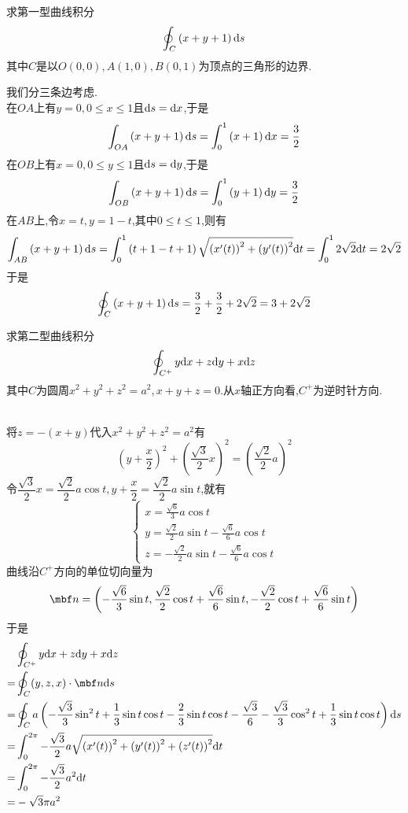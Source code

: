 \documentclass{ctexart}
\begin{document}
\begin{problem}[3.(12\songti{分})]
    求第一型曲线积分
    \[\oint_C\left(x+y+1\right)\mathrm{d} s\]
    其中$C$是以$O(0,0),A(1,0),B(0,1)$为顶点的三角形的边界.

\end{problem}
\begin{solution}
    我们分三条边考虑.\\
    在$OA$上有$y=0,0\leqslant x\leqslant 1$且$\mathrm{d} s=\mathrm{d} x$,于是
    \[\int_{OA}\left(x+y+1\right)\mathrm{d} s=\int_0^1\left(x+1\right)\mathrm{d} x=\dfrac32\]
    在$OB$上有$x=0,0\leqslant y\leqslant 1$且$\mathrm{d} s=\mathrm{d} y$,于是
    \[\int_{OB}\left(x+y+1\right)\mathrm{d} s=\int_0^1\left(y+1\right)\mathrm{d} y=\dfrac32\]
    在$AB$上,令$x=t,y=1-t$,其中$0\leqslant t\leqslant 1$,则有
    \[\int_{AB}\left(x+y+1\right)\mathrm{d} s=\int_0^1\left(t+1-t+1\right)\sqrt{\left(x'(t)\right)^2+\left(y'(t)\right)^2}\mathrm{d} t=\int_0^12\sqrt2\mathrm{d} t=2\sqrt2\]
    于是
    \[\oint_C\left(x+y+1\right)\mathrm{d} s=\dfrac32+\dfrac32+2\sqrt2=3+2\sqrt2\]

\end{solution}
\begin{problem}[4.(14\songti{分})]
    求第二型曲线积分
    \[\oint_{C^+}y\mathrm{d} x+z\mathrm{d} y+x\mathrm{d} z\]
    其中$C$为圆周$x^2+y^2+z^2=a^2,x+y+z=0$.从$x$轴正方向看,$C^+$为逆时针方向.
        
\end{problem}
\begin{solution}
    \\
    将$z=-(x+y)$代入$x^2+y^2+z^2=a^2$有
    \[\left(y+\dfrac x2\right)^2+\left(\dfrac{\sqrt3}{2}x\right)^2=\left(\dfrac{\sqrt2}{2}a\right)^2\]
    令$\dfrac{\sqrt3}{2}x=\dfrac{\sqrt2}{2}a\cos t,y+\dfrac x2=\dfrac{\sqrt2}{2}a\sin t$,就有
    \[\left\{\begin{array}{l}
        x=\frac{\sqrt6}{3}a\cos t \\
        y=\frac{\sqrt2}{2}a\sin t-\frac{\sqrt6}{6}a\cos t \\
        z=-\frac{\sqrt2}{2}a\sin t-\frac{\sqrt6}{6}a\cos t
    \end{array}\right.\]
    曲线沿$C^+$方向的单位切向量为
    \[\mbf n=\left(-\dfrac{\sqrt6}{3}\sin t,\dfrac{\sqrt2}{2}\cos t+\frac{\sqrt6}{6}\sin t,-\dfrac{\sqrt2}{2}\cos t+\frac{\sqrt6}{6}\sin t\right)\]
    于是
    \[\begin{aligned}
        &\oint_{C^+}y\dx+z\di y+x\di z \\
        =&\oint_C(y,z,x)\cdot\mbf n\di s \\
        =&\oint_Ca\left(-\frac{\sqrt3}{3}\sin^2 t+\frac13\sin t\cos t-\frac23\sin t\cos t-\frac{\sqrt3}{6}-\frac{\sqrt3}{3}\cos^2t+\frac13\sin t\cos t\right)\di s \\
        =&\int_0^{2\pi}-\dfrac{\sqrt3}{2}a\sqrt{\left(x'(t)\right)^2+\left(y'(t)\right)^2+\left(z'(t)\right)^2}\di t \\
        =&\int_0^{2\pi}-\dfrac{\sqrt3}{2}a^2\di t \\
        =&-\sqrt3\pi a^2
    \end{aligned}\]

\end{solution}
\end{document}
